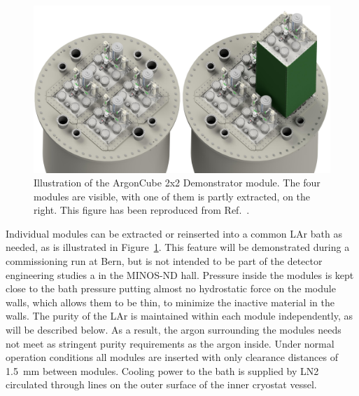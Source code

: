 \begin{figure}[htbp]
\centering
\includegraphics[width=\textwidth]{plots/BathAndModule}
\caption{Illustration of the ArgonCube 2x2 Demonstrator module. The four modules are visible, with one of them is partly extracted, on the right. This figure has been reproduced from Ref.~\cite{argoncube_loi}.}
\label{fig:2x2_extraction}
\end{figure}

Individual modules can be extracted or reinserted into a common LAr bath as needed, as is illustrated in Figure~\ref{fig:2x2_extraction}. This feature will be demonstrated during a commissioning run at Bern, but is not intended to be part of the detector engineering studies a in the MINOS-ND hall. Pressure inside the modules is kept close to the bath pressure putting almost no hydrostatic force on the module walls, which allows them to be thin, to minimize the inactive material in the walls. The purity of the LAr is maintained within each module independently, as will be described below. As a result, the argon surrounding the modules needs not meet as stringent purity requirements as the argon inside. Under normal operation conditions all modules are inserted with only clearance distances of \SI{1.5}{\milli\metre} between modules. Cooling power to the bath is supplied by LN2 circulated through lines on the outer surface of the inner cryostat vessel.

